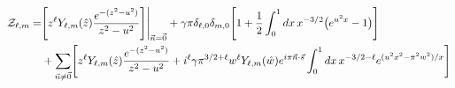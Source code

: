 \documentclass[a4paper]{article}
\begin{document}
\begin{align}
 {\cal Z}_{\ell,m}
 =&
 \Biggr[ z^{\ell} Y_{\ell,m}(\hat{z}) \frac{ e^{ -(z^{2} - u^{2})} }{ z^{2}-u^{2} }
 \Biggr] \Biggr|_{\vec{n}=\vec{0}}
 + \gamma \pi \delta_{\ell,0} \delta_{m,0} \Biggr[ 
 1 + \frac{1}{2} \int_{0}^{1} dx \, x^{-3/2} \big( e^{ u^{2} x } - 1 \big) \Biggr]
 \nonumber\\
 &+ \sum_{\vec{n}\neq\vec{0}}
 \Biggr[ z^{\ell} Y_{\ell,m}(\hat{z}) \frac{ e^{ -(z^{2} - u^{2})} }{ z^{2}-u^{2} }
 + i^\ell \gamma \pi^{3/2+\ell}
 w^{\ell} Y_{\ell,m}(\hat{w}) e^{i\pi \vec{n}\cdot\vec{s}}
 \int_{0}^{1} dx \, x^{-3/2-\ell} e^{ (u^{2} x^{2} -\pi^{2}w^{2}) /x } \Biggr]
\end{align}
\end{document}
